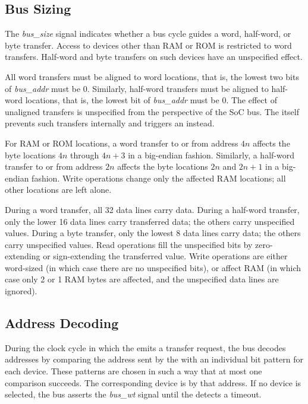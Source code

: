 \subsection{Bus Sizing}

The {\it bus\_size} signal indicates whether a bus cycle guides a word, half-word, or byte transfer. Access to devices other than RAM or ROM is restricted to word transfers. Half-word and byte transfers on such devices have an unspecified effect.

All word transfers must be aligned to word locations, that is, the lowest two bits of {\it bus\_addr} must be 0. Similarly, half-word transfers must be aligned to half-word locations, that is, the lowest bit of {\it bus\_addr} must be 0. The effect of unaligned transfers is unspecified from the perspective of the SoC bus. The \eco itself prevents such transfers internally and triggers an  instead.

For RAM or ROM locations, a word transfer to or from address $4n$ affects the byte locations $4n$ through $4n+3$ in a big-endian fashion. Similarly, a half-word transfer to or from address $2n$ affects the byte locations $2n$ and $2n+1$ in a big-endian fashion. Write operations change only the affected RAM locations; all other locations are left alone.

During a word transfer, all 32 data lines carry data. During a half-word transfer, only the lower 16 data lines carry transferred data; the others carry unspecified values. During a byte transfer, only the lowest 8 data lines carry data; the others carry unspecified values. Read operations fill the unspecified bits by zero-extending or sign-extending the transferred value. Write operations are either word-sized (in which case there are no unspecified bits), or affect RAM (in which case only 2 or 1 RAM bytes are affected, and the unspecified data lines are ignored).

\subsection{Address Decoding}

During the clock cycle in which the \eco emits a transfer request, the bus decodes addresses by comparing the address sent by the \eco with an individual bit pattern for each device. These patterns are chosen in such a way that at most one comparison succeeds. The corresponding device is  by that address. If no device is selected, the bus asserts the {\it bus\_wt} signal until the \eco detects a timeout.

